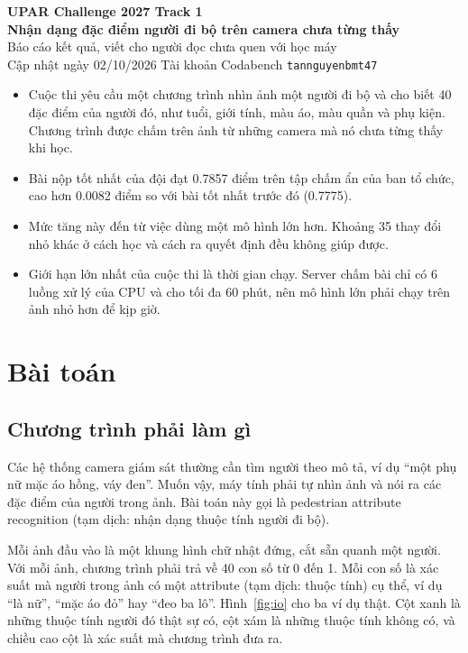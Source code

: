 \documentclass[11pt,a4paper]{article}
\begin{document}
\begin{center}
{\sffamily\bfseries\LARGE UPAR Challenge 2027 \textendash{} Track 1\\[3pt]
\Large Nhận dạng đặc điểm người đi bộ trên camera chưa từng thấy}\\[8pt]
{\large Báo cáo kết quả, viết cho người đọc chưa quen với học máy}\\[5pt]
{\small Cập nhật ngày 02/10/2026 \quad Tài khoản Codabench \texttt{tannguyenbmt47}}
\end{center}

\begin{ghichu}
\begin{itemize}[leftmargin=1.2em]
\item Cuộc thi yêu cầu một chương trình nhìn ảnh một người đi bộ và cho biết 40 đặc điểm của người đó, như tuổi, giới tính, màu áo, màu quần và phụ kiện. Chương trình được chấm trên ảnh từ những camera mà nó chưa từng thấy khi học.
\item Bài nộp tốt nhất của đội đạt 0.7857 điểm trên tập chấm ẩn của ban tổ chức, cao hơn 0.0082 điểm so với bài tốt nhất trước đó (0.7775).
\item Mức tăng này đến từ việc dùng một mô hình lớn hơn. Khoảng 35 thay đổi nhỏ khác ở cách học và cách ra quyết định đều không giúp được.
\item Giới hạn lớn nhất của cuộc thi là thời gian chạy. Server chấm bài chỉ có 6 luồng xử lý của CPU và cho tối đa 60 phút, nên mô hình lớn phải chạy trên ảnh nhỏ hơn để kịp giờ.
\end{itemize}
\end{ghichu}

\section{Bài toán}

\subsection{Chương trình phải làm gì}

Các hệ thống camera giám sát thường cần tìm người theo mô tả, ví dụ ``một phụ nữ mặc áo hồng, váy đen''. Muốn vậy, máy tính phải tự nhìn ảnh và nói ra các đặc điểm của người trong ảnh. Bài toán này gọi là pedestrian attribute recognition (tạm dịch: nhận dạng thuộc tính người đi bộ).

Mỗi ảnh đầu vào là một khung hình chữ nhật đứng, cắt sẵn quanh một người. Với mỗi ảnh, chương trình phải trả về 40 con số từ 0 đến 1. Mỗi con số là xác suất mà người trong ảnh có một attribute (tạm dịch: thuộc tính) cụ thể, ví dụ ``là nữ'', ``mặc áo đỏ'' hay ``đeo ba lô''. Hình~\ref{fig:io} cho ba ví dụ thật. Cột xanh là những thuộc tính người đó thật sự có, cột xám là những thuộc tính không có, và chiều cao cột là xác suất mà chương trình đưa ra.
\end{document}

